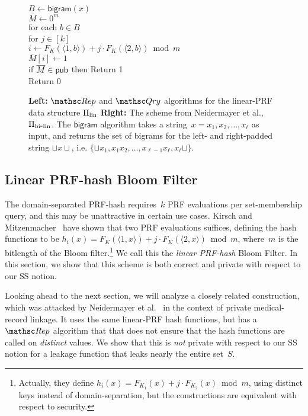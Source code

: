\begin{figure}[tp]
{\medskip
{}\\
$B \gets \mathsf{bigram}(x)$\\
$\overline{M} \gets 0^m$\\
for each $b \in B$\\
\nudge for $j \in [k]$\\
\nudge\nudge $i \gets F_{K}(\langle 1,b \rangle)+j\cdot F_{K}(\langle 2,b \rangle) \bmod m$\\
\nudge\nudge $\overline{M}[i] \gets 1$\\
if $\overline{M} \in {\sf pub}$ then Return 1 \\
Return 0
}
\caption{{\bf Left:} $\Rep$ and $\Qry$ algorithms for the linear-PRF
  data structure $\Pi_{\mathrm{lin}}$ {\bf Right:}
The scheme from Neidermayer et al.\cite{xxx}, $\Pi_{\mathrm{bi}\mbox{-}\mathrm{lin}}$. The $\mathsf{bigram}$
algorithm takes a string~$x=x_1,x_2,\ldots,x_\ell$ as input, and
returns the set of bigrams for the left- and right-padded string
$\sqcup x \sqcup$, i.e. $\{\sqcup x_1, x_1x_2,\ldots,x_{\ell-1}x_\ell,x_\ell\sqcup\}$.
}
\label{fig:lin-and-bi-lin}
\label{fig:neidermayer}
\end{figure}

\subsection{Linear PRF-hash Bloom Filter }
The domain-separated PRF-hash requires~$k$ PRF evaluations per set-membership query, and this may be unattractive in certain use cases.  Kirsch and Mitzenmacher~\cite{xxx} have shown that two PRF evaluations suffices, defining the hash functions to be $h_i(x)=F_K(\langle 1,x \rangle) + j\cdot F_K(\langle 2,x \rangle) \bmod m$, where~$m$ is the bitlength of the Bloom filter.\footnote{Actually, they define $h_i(x)=F_{K_1}(x)  + j\cdot F_{K_2}(x) \bmod m$, using distinct keys instead of domain-separation, but the constructions are equivalent with respect to security.} We call this the \emph{linear PRF-hash} Bloom Filter.  In this section, we show that this scheme is both correct and private with respect to our SS notion.  

Looking ahead to the next section, we will analyze a closely related construction, which was attacked by Neidermayer et al.~\cite{xxx} in the context of private medical-record linkage.  It uses the same linear-PRF hash functions, but has a $\Rep$ algorithm that that does not ensure that the hash functions are called on \emph{distinct} values.  We show that this is \emph{not} private with respect to our SS notion for a leakage function that leaks nearly the entire set~$S$.   

